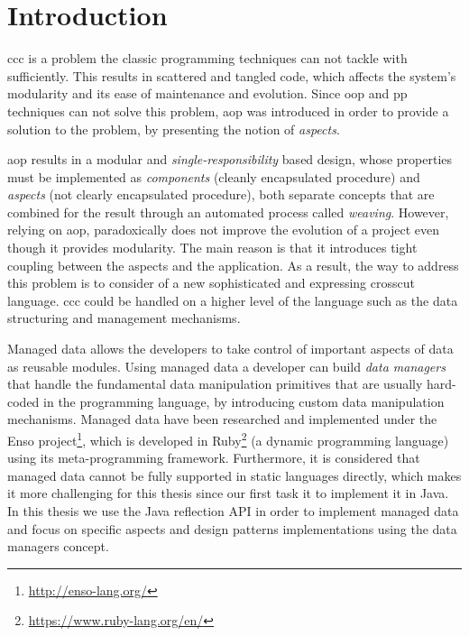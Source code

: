 
\chapter{Introduction}\label{Introduction}
\ac{ccc} is a problem the classic programming techniques can not tackle with sufficiently. 
This results in scattered and tangled code, which affects the system's modularity and its ease of maintenance and evolution. 
Since \ac{oop} and \ac{pp} techniques can not solve this problem, \ac{aop} was introduced \cite{kiczales1997aspect} in order to provide a solution to the problem, by presenting the notion of \textit{aspects}.

\ac{aop} results in a modular and \textit{single-responsibility} based design, whose properties must be implemented as \textit{components} (cleanly encapsulated procedure) and \textit{aspects} (not clearly encapsulated procedure), both separate concepts that are combined for the result through an automated process called \textit{weaving}. 
However, relying on \ac{aop}, paradoxically does not improve the evolution of a project even though it provides modularity. 
The main reason is that it introduces tight coupling between the aspects and the application. 
As a result, the way to address this problem is to consider of a new sophisticated and expressing crosscut language. 
\ac{ccc} could be handled on a higher level of the language such as the data structuring and management mechanisms.

Managed data \cite{loh2012managed} allows the developers to take control of important aspects of data as reusable modules. 
Using managed data a developer can build \textit{data managers} that handle the fundamental data manipulation primitives that are usually hard-coded in the programming language, by introducing custom data manipulation mechanisms. 
Managed data have been researched and implemented under the Enso project\footnote{\label{foot:enso}\url{http://enso-lang.org/}}, which is developed in Ruby\footnote{\label{ruby}\url{https://www.ruby-lang.org/en/}} (a dynamic programming language) using its meta-programming framework.
Furthermore, it is considered \cite{loh2012managed} that managed data cannot be fully supported in static languages directly, which makes it more challenging for this thesis since our first task it to implement it in Java.
In this thesis we use the Java reflection API in order to implement managed data and focus on specific aspects and design patterns implementations using the data managers concept. 

